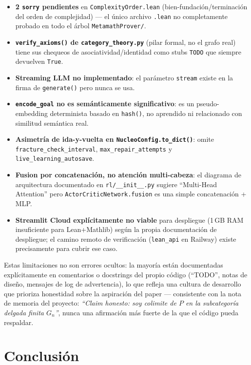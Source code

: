 \documentclass[11pt,a4paper]{report}
\newcommand{\code}[1]{\texttt{#1}}
\begin{document}
\begin{itemize}
  \item \textbf{2 \code{sorry} pendientes} en \code{ComplexityOrder.lean} (bien-fundaci\'on/terminaci\'on del orden de complejidad) --- el \'unico archivo \code{.lean} no completamente probado en todo el \'arbol \code{MetamathProver/}.
  \item \textbf{\code{verify_axioms()} de \code{category_theory.py}} (pilar formal, no el grafo real) tiene sus chequeos de asociatividad/identidad como stubs \code{TODO} que siempre devuelven \code{True}.
  \item \textbf{Streaming LLM no implementado}: el par\'ametro \code{stream} existe en la firma de \code{generate()} pero nunca se usa.
  \item \textbf{\code{encode_goal} no es sem\'anticamente significativo}: es un pseudo-embedding determinista basado en \code{hash()}, no aprendido ni relacionado con similitud sem\'antica real.
  \item \textbf{Asimetr\'ia de ida-y-vuelta en \code{NucleoConfig.to_dict()}}: omite \code{fracture_check_interval}, \code{max_repair_attempts} y \code{live_learning_autosave}.
  \item \textbf{Fusion por concatenaci\'on, no atenci\'on multi-cabeza}: el diagrama de arquitectura documentado en \code{rl/\_\_init\_\_.py} sugiere ``Multi-Head Attention'' pero \code{ActorCriticNetwork.fusion} es una simple concatenaci\'on + MLP.
  \item \textbf{Streamlit Cloud expl\'icitamente no viable} para despliegue (1\,GB RAM insuficiente para Lean+Mathlib) seg\'un la propia documentaci\'on de despliegue; el camino remoto de verificaci\'on (\code{lean_api} en Railway) existe precisamente para cubrir ese caso.
\end{itemize}

Estas limitaciones no son errores ocultos: la mayor\'ia est\'an documentadas expl\'icitamente en comentarios o docstrings del propio c\'odigo (``TODO'', notas de dise\~no, mensajes de log de advertencia), lo que refleja una cultura de desarrollo que prioriza honestidad sobre la aspiraci\'on del paper --- consistente con la nota de memoria del proyecto: \emph{``Claim honesto: soy colimite de $P$ en la subcategor\'ia delgada finita $G_n$''}, nunca una afirmaci\'on m\'as fuerte de la que el c\'odigo pueda respaldar.

\chapter{Conclusi\'on}
\end{document}
